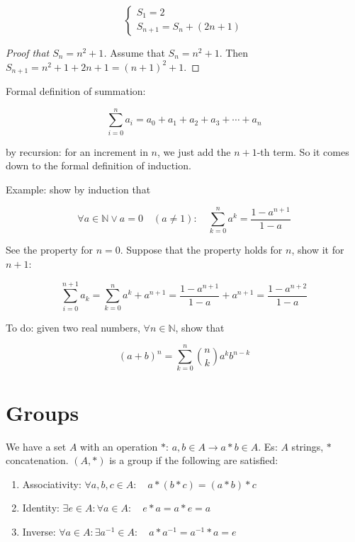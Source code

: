 \documentclass[12pt,a4paper]{report}
\numberwithin{equation}{section}
\theoremstyle{definition}
\theoremstyle{remark}
\begin{document}
\begin{equation}
\begin{cases}
S_1 = 2\\
S_{n+1} = S_n + (2n+1)
\end{cases}
\end{equation}


\begin{proof}[Proof that $S_n = n^2 + 1$]
Assume that $S_n = n^2 +1$. Then $S_{n+1} = n^2 + 1 + 2n + 1 = (n+1)^2 + 1$.
\end{proof}

Formal definition of summation:

\begin{equation}
\sum_{i=0}^n a_i =a_0 + a_1 + a_2 + a_3 + \cdots + a_n
\end{equation}

by recursion: for an increment in $n$, we just add the $n+1$-th term. So it comes down to the formal definition of induction.

Example: show by induction that

\begin{equation}
\forall a \in \mathbb{N} \vee a=0 \quad (a\neq 1): \quad \sum_{k=0}^n a^k = \frac{1-a^{n+1}}{1-a}
\end{equation}

See the property for $n=0$. Suppose that the property holds for $n$, show it for $n+1$:

\begin{equation}
\sum_{i=0}^{n+1} a_k = \sum_{k=0}^n a^k + a^{n+1} = \frac{1-a^{n+1}}{1-a} + a^{n+1} = \frac{1-a^{n+2}}{1-a}
\end{equation}

To do: given two real numbers, $\forall n \in \mathbb{N}$, show that

\begin{equation}
(a+b)^n = \sum_{k=0}^n {n\choose k} a^k b^{n-k}
\end{equation}

\section{Groups}

We have a set $A$ with an operation $*$: $a, b \in A \rightarrow a*b \in A$. Es: $A$ strings, $*$ concatenation. $(A, *)$ is a group if the following are satisfied:

\begin{enumerate}
\item Associativity: $\forall a, b, c \in A: \quad a* (b*c) = (a*b)*c$
\item Identity: $\exists e \in A: \forall a \in A: \quad e*a = a*e = a$
\item Inverse: $\forall a \in A: \exists a^{-1} \in A: \quad a* a^{-1} = a^{-1} * a = e$
\end{enumerate}
\end{document}
